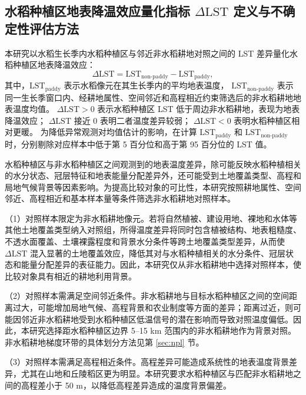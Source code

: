 \subsection{水稻种植区地表降温效应量化指标 $\Delta\mathrm{LST}$ 定义与不确定性评估方法}
\label{sec:lst_cooling_definition}
本研究以水稻生长季内水稻种植区与邻近非水稻耕地对照之间的 LST 差异量化水稻种植区地表降温效应：
\begin{equation}
    \Delta \mathrm{LST} = \mathrm{LST}_{\mathrm{non\text{-}paddy}} - \mathrm{LST}_{\mathrm{paddy}},
\end{equation}
其中，$\mathrm{LST}_{\mathrm{paddy}}$ 表示水稻像元在其生长季内的平均地表温度，
$\mathrm{LST}_{\mathrm{non\text{-}paddy}}$ 表示同一生长季窗口内、经耕地属性、空间邻近和高程相近约束筛选后的非水稻耕地地表温度均值。
$\Delta \mathrm{LST}>0$ 表示水稻种植区 LST 低于周边非水稻耕地，表现为地表降温效应；
$\Delta \mathrm{LST}$ 接近 0 表明二者温度差异较弱；
$\Delta \mathrm{LST}<0$ 表明水稻种植区相对更暖。
为降低异常观测对均值估计的影响，在计算 $\mathrm{LST}_{\mathrm{paddy}}$ 和 $\mathrm{LST}_{\mathrm{non\text{-}paddy}}$ 时，分别剔除对应样本中低于第 5 百分位和高于第 95 百分位的 LST 值。

水稻种植区与非水稻种植区之间观测到的地表温度差异，除可能反映水稻种植相关的水分状态、冠层特征和地表能量分配差异外，还可能受到土地覆盖类型、高程和局地气候背景等因素影响。为提高比较对象的可比性，本研究按照耕地属性、空间邻近、高程相近和基本样本量等条件筛选非水稻耕地对照样本。

（1）对照样本限定为非水稻耕地像元。若将自然植被、建设用地、裸地和水体等其他土地覆盖类型纳入对照组，所得温度差异将同时包含植被结构、地表粗糙度、不透水面覆盖、土壤裸露程度和背景水分条件等跨土地覆盖类型差异，从而使 $\Delta\mathrm{LST}$ 混入显著的土地覆盖效应，降低其对与水稻种植相关的水分条件、冠层状态和能量分配差异的表征能力。因此，本研究仅从非水稻耕地中选择对照样本，使比较对象具有相近的耕地利用背景。

（2）对照样本需满足空间邻近条件。非水稻耕地与目标水稻种植区之间的空间距离过大，可能增加局地气候、高程背景和农业制度等方面的差异；距离过近，则可能因邻近非水稻耕地受到水稻种植区低温信号的潜在影响而导致对照温度偏低。因此，本研究选择距水稻种植区边界 5--15 km 范围内的非水稻耕地作为背景对照。非水稻耕地梯度环带的具体划分方法见第 \ref{sec:npl} 节。

（3）对照样本需满足高程相近条件。高程差异可能造成系统性的地表温度背景差异，尤其在山地和丘陵稻区更为明显。本研究要求水稻种植区与匹配非水稻耕地之间的高程差小于 50 m，以降低高程差异造成的温度背景偏差。

